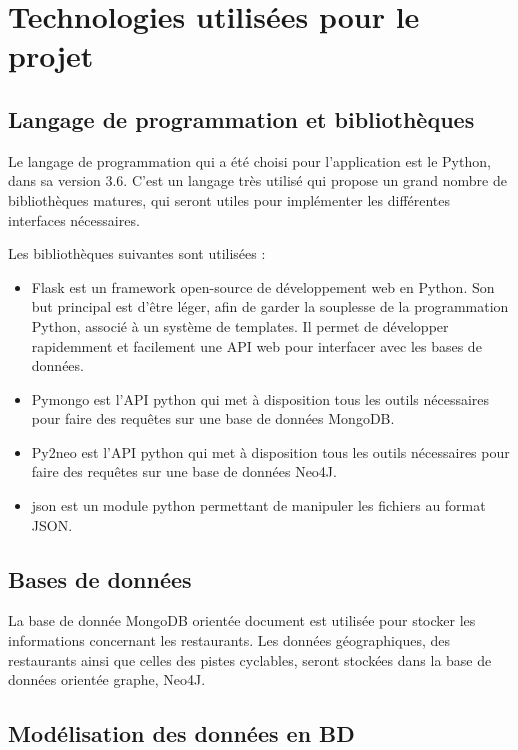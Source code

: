 \documentclass[11pt,a4paper]{article}
\begin{document}
\section{Technologies utilisées pour le projet}

\subsection{Langage de programmation et bibliothèques}

    Le langage de programmation qui a été choisi pour l'application est le Python, dans sa version 3.6. C'est un langage très utilisé qui propose un grand nombre de bibliothèques matures, qui seront utiles pour implémenter les différentes interfaces nécessaires.

    Les bibliothèques suivantes sont utilisées :

    \begin{itemize}
        \item Flask est un framework open-source de développement web en Python. Son but principal est d'être léger, afin de garder la souplesse de la programmation Python, associé à un système de templates. Il permet de développer rapidemment et facilement une API web pour interfacer avec les bases de données.
        \item Pymongo est l'API python qui met à disposition tous les outils nécessaires pour faire des requêtes sur une base de données MongoDB.
        \item Py2neo est l'API python qui met à disposition tous les outils nécessaires pour faire des requêtes sur une base de données Neo4J.
        \item json est un module python permettant de manipuler les fichiers au format JSON. 
    \end{itemize}

\subsection{Bases de données}

    La base de donnée MongoDB orientée document est utilisée pour stocker les informations concernant les restaurants. Les données géographiques, des restaurants ainsi que celles des pistes cyclables, seront stockées dans la base de données orientée graphe, Neo4J.

\subsection{Modélisation des données en BD}
\end{document}
